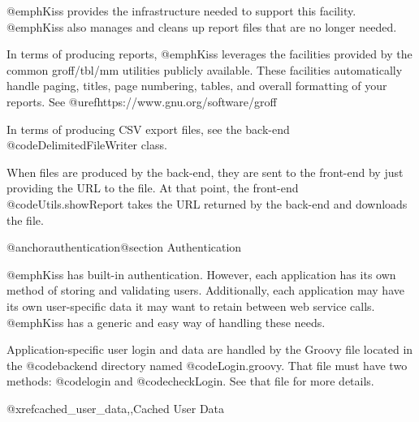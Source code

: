 @emph{Kiss} provides the infrastructure needed to support this facility.
@emph{Kiss} also manages and cleans up report files that are no longer needed.

In terms of producing reports, @emph{Kiss} leverages the facilities
provided by the common groff/tbl/mm utilities publicly available.
These facilities automatically handle paging, titles, page numbering,
tables, and overall formatting of your reports. See
@uref{https://www.gnu.org/software/groff}

In terms of producing CSV export files, see the back-end
@code{DelimitedFileWriter} class.

When files are produced by the back-end, they are sent to the
front-end by just providing the URL to the file.  At that point, the
front-end @code{Utils.showReport} takes the URL returned by the back-end
and downloads the file.

@anchor{authentication}@section Authentication

@emph{Kiss} has built-in authentication.  However, each application has its
own method of storing and validating users.  Additionally, each application
may have its own user-specific data it may want to retain between web service
calls. @emph{Kiss} has a generic and easy way of handling these needs.

Application-specific user login and data are handled by the Groovy file
located in the @code{backend} directory named @code{Login.groovy}.
That file must have two methods: @code{login} and @code{checkLogin}.  
See that file for more details.

@xref{cached_user_data,,Cached User Data}
